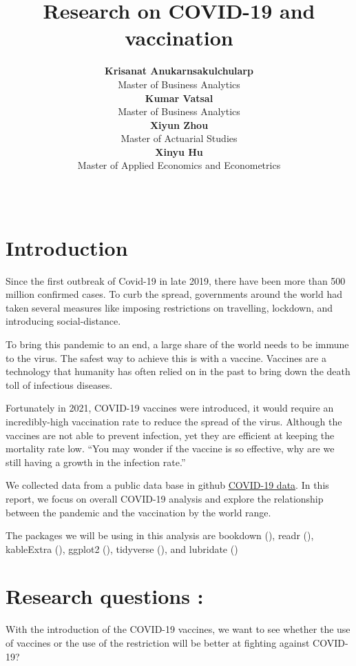 \documentclass[11pt,a4paper,]{article}
\title{Research on COVID-19 and vaccination}
\author{\sf\Large\textbf{ Krisanat Anukarnsakulchularp}\\ {\sf\large Master of Business Analytics\\[0.5cm]} \sf\Large\textbf{ Kumar Vatsal}\\ {\sf\large Master of Business Analytics\\[0.5cm]} \sf\Large\textbf{ Xiyun Zhou}\\ {\sf\large Master of Actuarial Studies\\[0.5cm]} \sf\Large\textbf{ Xinyu Hu}\\ {\sf\large Master of Applied Economics and Econometrics\\[0.5cm]}}
\date{\sf\Date~\Month~\Year}
\makeatletter
\def\titlepage{\front{\expandafter{\@title}}{\@author}{\@organization}}
\makeatother
\begin{document}
\titlepage

\clearpage

\hypertarget{introduction}{%
\section{\texorpdfstring{\textbf{Introduction}}{Introduction}}\label{introduction}}

Since the first outbreak of Covid-19 in late 2019, there have been more than 500 million confirmed cases. To curb the spread, governments around the world had taken several measures like imposing restrictions on travelling, lockdown, and introducing social-distance.

To bring this pandemic to an end, a large share of the world needs to be immune to the virus. The safest way to achieve this is with a vaccine. Vaccines are a technology that humanity has often relied on in the past to bring down the death toll of infectious diseases.

Fortunately in 2021, COVID-19 vaccines were introduced, it would require an incredibly-high vaccination rate to reduce the spread of the virus. Although the vaccines are not able to prevent infection, yet they are efficient at keeping the mortality rate low. ``You may wonder if the vaccine is so effective, why are we still having a growth in the infection rate.''

We collected data from a public data base in github \href{https://github.com/owid/covid-19-data/tree/master/public/data}{COVID-19 data}. In this report, we focus on overall COVID-19 analysis and explore the relationship between the pandemic and the vaccination by the world range.

The packages we will be using in this analysis are bookdown (\textcite{bookdown}), readr (\textcite{readr}), kableExtra (\textcite{kableExtra}), ggplot2 (\textcite{ggplot2}), tidyverse (\textcite{tidyverse}), and lubridate (\textcite{lubridate})

\clearpage

\hypertarget{research-questions}{%
\section{\texorpdfstring{\textbf{Research questions} :}{Research questions :}}\label{research-questions}}

With the introduction of the COVID-19 vaccines, we want to see whether the use of vaccines or the use of the restriction will be better at fighting against COVID-19?
\end{document}
